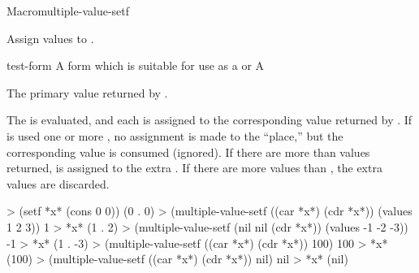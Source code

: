 \documentclass[10pt,twoside,english,pdftex]{article}
\begin{document}
\begin{functiondoc}{Macro}{multiple-value-setf}{%
  
 \returns{} } 
  
\fnsyntax

\fnpurpose Assign values to .

\fnpackage {}

\fnmodule {}

\fnargs
\begin{args}{test-form}
\arg[place] A form which is suitable for use as a
   or \nil 
\arg[form] A 
\end{args}

\fnreturns The primary value returned by .

\fndescription
% 
The  is evaluated, and each  is assigned to the
corresponding value returned by .  If \nil{} is used one or more
, no assignment is made to the \nil{} ``place,'' but the
corresponding value is consumed (ignored). If there are more 
than values returned, \nil{} is assigned to the extra . If there
are more values than , the extra values are discarded.

\fnexamples
%
\W\supp
\begin{example}
> (setf *x* (cons 0 0))
(0 . 0)
> (multiple-value-setf ((car *x*) (cdr *x*)) (values 1 2 3))
1
> *x*
(1 . 2)\goodpagebreak
> (multiple-value-setf (nil nil (cdr *x*)) (values -1 -2 -3))
-1
> *x*
(1 . -3)\goodpagebreak
> (multiple-value-setf ((car *x*) (cdr *x*)) 100)
100
> *x*
(100)\goodpagebreak
> (multiple-value-setf ((car *x*) (cdr *x*)) nil)
nil
> *x*
(nil)\goodpagebreak

\end{example}

\end{functiondoc}

\end{document}
